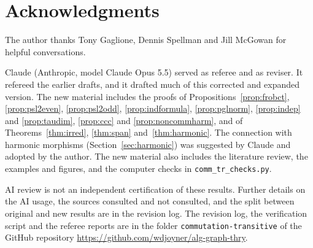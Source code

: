 \documentclass[12pt,letterpaper]{article}
\numberwithin{equation}{section}
\theoremstyle{plain}
\theoremstyle{definition}
\begin{document}
\section*{Acknowledgments}

The author thanks Tony Gaglione, Dennis Spellman and Jill McGowan for
helpful conversations.

Claude (Anthropic, model Claude Opus 5.5) served as referee and as reviser.
It refereed the earlier drafts, and it drafted much of this corrected and
expanded version. The new material includes the
proofs of
Propositions~\ref{prop:frobct}, \ref{prop:psl2even}, \ref{prop:psl2odd},
\ref{prop:indformula}, \ref{prop:pglnorm}, \ref{prop:indep} and
\ref{prop:taudim}, \ref{prop:ccc} and \ref{prop:noncommharm}, and of
Theorems~\ref{thm:irred}, \ref{thm:span} and~\ref{thm:harmonic}. The
connection with harmonic morphisms (Section~\ref{sec:harmonic}) was
suggested by Claude and adopted by the author. The new material also
includes the literature review, the examples and figures, and the computer
checks in \texttt{comm\_tr\_checks.py}.

AI review is not an independent certification of these results. Further
details on the AI usage, the sources consulted and not consulted, and the
split between original and new results are in the revision log. The
revision log, the verification script and the referee reports are in the
folder \texttt{commutation-transitive} of the GitHub repository
\url{https://github.com/wdjoyner/alg-graph-thry}.
\end{document}
